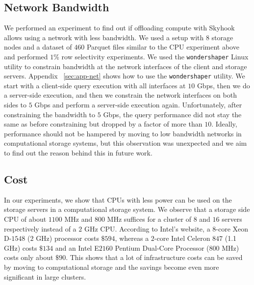 \documentclass[11pt]{article}
\newcommand{\code}[1]{\colorbox{light-gray}{\texttt{#1}}}
\begin{document}
\subsection{Network Bandwidth}
We performed an experiment to find out if offloading compute with Skyhook allows using a network with less bandwidth. We used a setup with $8$ storage nodes and a dataset of $460$ Parquet files similar to the CPU experiment above and performed $1$\% row selectivity experiments. We used the \code{wondershaper} Linux utility to constrain bandwidth at the network interfaces of the client and storage servers. Appendix ~\ref{sec:app-net} shows how to use the \code{wondershaper} utility. We start with a client-side query execution with all interfaces at $10$ Gbps, then we do a server-side execution, and then we constrain the network interfaces on both sides to $5$ Gbps and perform a server-side execution again. Unfortunately, after constraining the bandwidth to $5$ Gbps, the query performance did not stay the same as before constraining but dropped by a factor of more than $10$. Ideally, performance should not be hampered by moving to low bandwidth networks in computational storage systems, but this observation was unexpected and we aim to find out the reason behind this in future work.

\subsection{Cost}
In our experiments, we show that CPUs with less power can be used on the storage servers in a computational storage system. We observe that a storage side CPU of about $1100$ MHz and $800$ MHz suffices for a cluster of $8$ and $16$ servers respectively instead of a $2$ GHz CPU. According to Intel's website, a $8$-core Xeon D-$1548$ ($2$ GHz) processor costs $\$594$, whereas a $2$-core Intel Celeron $847$ (1.1 GHz) costs $\$134$ and an Intel E$2160$ Pentium Dual-Core Processor ($800$ MHz) costs only about $\$90$. This shows that a lot of infrastructure costs can be saved by moving to computational storage and the savings become even more significant in large clusters.
\end{document}
